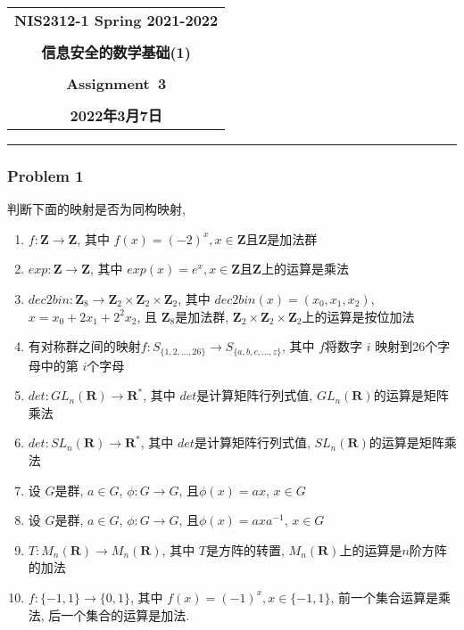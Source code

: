 \documentclass[a4paper,12pt]{ctexart}
\newcommand{\Z}{\mathbf{Z}}
\newcommand{\R}{\mathbf{R}}
\begin{document}
  \begin{center}

  \vspace{-0.3in}
  \begin{tabular}{c}
    \textbf{\Large NIS2312-1 Spring 2021-2022} \\
    \textbf{\Large  } \\
    \textbf{\Large  信息安全的数学基础(1)} \\
    \textbf{\Large  } \\
    \textbf{\Large  Assignment~3} \\
    \textbf{\Large  } \\
    \textbf{\Large 2022年3月7日} \\
  \end{tabular}
  \end{center}
  \noindent
  \rule{\linewidth}{0.4pt}
  
\subsubsection*{Problem 1}
    判断下面的映射是否为同构映射, 
    \begin{enumerate}
        \item $ f:\Z\rightarrow\Z $, 其中 $ f(x)=(-2)^x,x\in\Z $且$ \Z $是加法群
        \item $ exp:\Z\rightarrow\Z $, 其中 $ exp(x)=e^x,x\in\Z $且$ \Z $上的运算是乘法
        \item $ dec2bin:\Z_{8}\rightarrow\Z_{2}\times\Z_2\times\Z_2 $, 其中 $ dec2bin(x)=(x_0,x_1,x_2) $, $ x=x_0+2x_1+2^2x_2 $, 且 $ \Z_8 $是加法群, $ \Z_2\times\Z_2\times\Z_2 $上的运算是按位加法
        \item 有对称群之间的映射$ f:S_{\{1,2,\dots,26\}}\rightarrow S_{\{a,b,c,\dots,z\}}$, 其中 $ f $将数字 $ i $ 映射到26个字母中的第 $ i $个字母
        \item $ det:GL_n(\R)\rightarrow\R^* $, 其中 $ det $是计算矩阵行列式值, $GL_n(\R)$的运算是矩阵乘法
        \item $ det:SL_n(\R)\rightarrow\R^* $, 其中 $ det $是计算矩阵行列式值, $SL_n(\R)$的运算是矩阵乘法
        \item 设 $ G $是群, $ a\in G $, $ \phi:G\rightarrow G $, 且$ \phi(x)=ax $, $  x\in G $
        \item 设 $ G $是群, $ a\in G $, $ \phi:G\rightarrow G $, 且$ \phi(x)=axa^{-1} $, $  x\in G $
        \item $ T:M_n(\R)\rightarrow M_n(\R) $, 其中 $ T $是方阵的转置, $ M_n(\R) $上的运算是$n$阶方阵的加法
        \item $ f:\{-1,1\}\rightarrow\{0,1\} $, 其中 $ f(x)=(-1)^x,x\in\{-1,1\} $, 前一个集合运算是乘法, 后一个集合的运算是加法.
    \end{enumerate}
\end{document}
